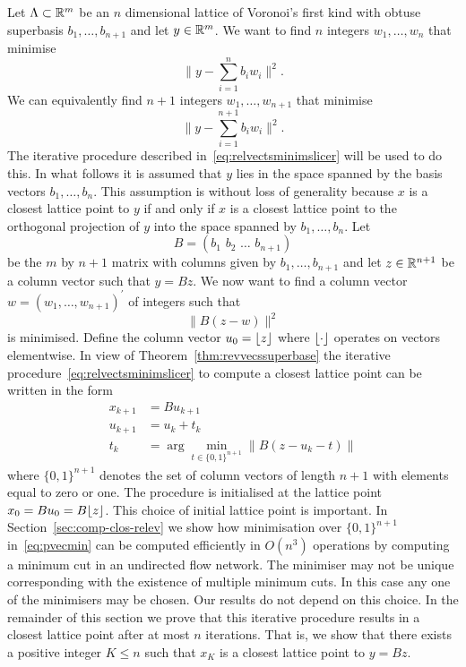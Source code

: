 \documentclass[final,leqno]{siamltex}
\begin{document}
Let $\Lambda \subset {\mathbb R}^m$ be an $n$ dimensional lattice of Voronoi's first kind with obtuse superbasis $b_1,\dots,b_{n+1}$ and let $y \in {\mathbb R}^m$.  We want to find $n$ integers $w_1,\dots,w_n$ that minimise
\[
\| y - \sum_{i=1}^n b_i w_i \|^2.
\]
We can equivalently find $n+1$ integers $w_1,\dots,w_{n+1}$ that minimise
\[
\| y - \sum_{i=1}^{n+1} b_i w_i \|^2.
\]
The iterative procedure described in~\eqref{eq:relvectsminimslicer} will be used to do this.  In what follows it is assumed that $y$ lies in the space spanned by the basis vectors $b_1,\dots,b_{n}$.  This assumption is without loss of generality because $x$ is a closest lattice point to $y$ if and only if $x$ is a closest lattice point to the orthogonal projection of $y$ into the space spanned by $b_1,\dots,b_{n}$.  Let
\[
B = (b_1\,\,b_2\,\,\dots\,\,b_{n+1})
\]
be the $m$ by $n+1$ matrix with columns given by $b_1,\dots,b_{n+1}$ and let $z \in {\mathbb R}^{n+1}$ be a column vector such that $y = Bz$.  We now want to find a column vector $w = (w_1,\dots,w_{n+1})^\prime$ of integers such that
\begin{equation}\label{eq:tominimise}
\| B(z  -  w) \|^2
\end{equation}
is minimised.  Define the column vector $u_0 = {\left\lfloor z \right\rfloor}$ where ${\left\lfloor \cdot \right\rfloor}$ operates on vectors elementwise. In view of Theorem~\ref{thm:revvecssuperbase} the iterative procedure~\eqref{eq:relvectsminimslicer} to compute a closest lattice point can be written in the form
\begin{align}
x_{k+1} &= B u_{k+1} \label{eq:xseqfirsttype}  \\
u_{k+1} &= u_k + t_k \nonumber \\
t_k &= \arg\min_{t \in \{0,1\}^{n+1}}\| B(z - u_k - t) \| \label{eq:pvecmin}
\end{align}
where $\{0,1\}^{n+1}$ denotes the set of column vectors of length $n+1$ with elements equal to zero or one.  The procedure is initialised at the lattice point $x_0 = Bu_0 = B{\left\lfloor z \right\rfloor}$.  This choice of initial lattice point is important.  In Section~\ref{sec:comp-clos-relev} we show how minimisation over $\{0,1\}^{n+1}$ in~\eqref{eq:pvecmin} can be computed efficiently in $O(n^3)$ operations by computing a minimum cut in an undirected flow network.  The minimiser may not be unique corresponding with the existence of multiple minimum cuts.  In this case any one of the minimisers may be chosen.  Our results do not depend on this choice.   In the remainder of this section we prove that this iterative procedure results in a closest lattice point after at most $n$ iterations.  That is, we show that there exists a positive integer $K \leq n$ such that $x_K$ is a closest lattice point to $y = Bz$.
\end{document}
